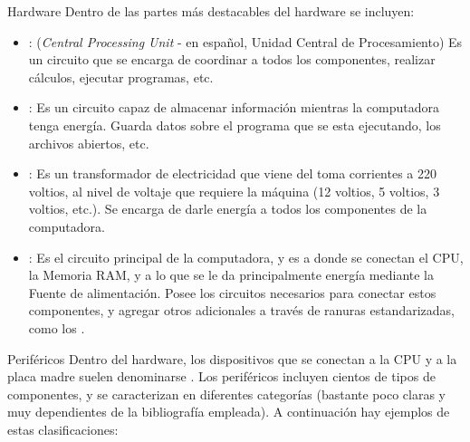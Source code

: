 \begin{frame}[shrink]{Hardware}
  Dentro de las partes más destacables del hardware se incluyen:
  \begin{itemize}
    \item {}: (\textit{Central Processing Unit} - en español, Unidad
      Central de Procesamiento) Es un circuito que se encarga de coordinar a
      todos los componentes, realizar cálculos, ejecutar programas, etc.
    \item {}: Es un circuito capaz de almacenar información
      mientras la computadora tenga energía. Guarda datos sobre el programa que
      se esta ejecutando, los archivos abiertos, etc.
    \item {}: Es un transformador de electricidad
      que viene del toma corrientes a 220 voltios, al nivel de voltaje que requiere la
      máquina (12 voltios, 5 voltios, 3 voltios, etc.). Se encarga de darle energía a todos los
      componentes de la computadora.
    \item {}:  Es el circuito principal de la computadora, y
      es a donde se conectan el CPU, la Memoria RAM, y a lo que se le da
      principalmente energía mediante la Fuente de alimentación. Posee los
      circuitos necesarios para conectar estos componentes, y agregar otros
      adicionales a través de ranuras estandarizadas, como los
      .
  \end{itemize}
\end{frame}


\begin{frame}[shrink]{Periféricos}
  Dentro del hardware, los dispositivos que se conectan a la CPU y a la
  placa madre suelen denominarse .
  \jump
  Los periféricos incluyen cientos de tipos de componentes, y se caracterizan en
  diferentes categorías (bastante poco claras y muy dependientes de la
  bibliografía empleada).
  \jump
  A continuación hay ejemplos de estas clasificaciones:
\end{frame}


